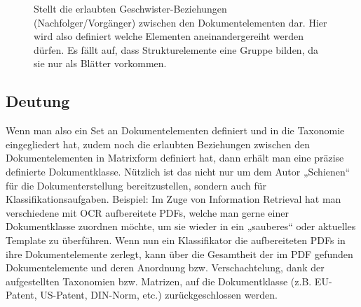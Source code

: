  
\begin{figure}[h!]
\centering
\advance\leftskip-2.5cm
\caption[Matrix über Geschwister-Beziehungen]{ Stellt die erlaubten Geschwister-Beziehungen (Nachfolger/Vorgänger) zwischen den Dokumentelementen dar. Hier wird also definiert welche Elementen aneinandergereiht werden dürfen. Es fällt auf, dass Strukturelemente eine Gruppe bilden, da sie nur als Blätter vorkommen. }\label{matrixgeschwister}
\end{figure}
 
\subsection{Deutung}\label{}
 
Wenn man also ein Set an Dokumentelementen definiert und in die Taxonomie eingegliedert hat, zudem noch die erlaubten Beziehungen zwischen den Dokumentelementen in Matrixform definiert hat, dann erhält man eine präzise definierte Dokumentklasse. Nützlich ist das nicht nur um dem Autor „Schienen“ für die Dokumenterstellung bereitzustellen, sondern auch für Klassifikationsaufgaben. Beispiel: Im Zuge von Information Retrieval hat man verschiedene mit OCR aufbereitete PDFs, welche man gerne einer Dokumentklasse zuordnen möchte, um sie wieder in ein „sauberes“ oder aktuelles Template zu überführen. Wenn nun ein Klassifikator die aufbereiteten PDFs in ihre Dokumentelemente zerlegt, kann über die Gesamtheit der im PDF gefunden Dokumentelemente und deren Anordnung bzw. Verschachtelung, dank der aufgestellten Taxonomien bzw. Matrizen, auf die Dokumentklasse (z.B. EU-Patent, US-Patent, DIN-Norm, etc.) zurückgeschlossen werden.

